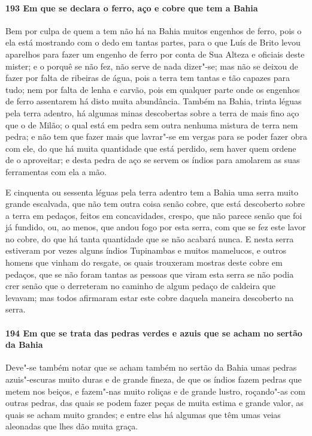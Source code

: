\begin{linenumbers}
\paragraph{193 Em que se declara o ferro, aço e cobre que tem a Bahia}\quad
Bem por culpa de quem a tem não há na Bahia muitos engenhos de ferro, pois o ela está
mostrando com o dedo em tantas partes, para o que Luís de Brito levou aparelhos para fazer
um engenho de ferro por conta de Sua Alteza e oficiais deste mister; e o porquê se não
fez, não serve de nada dizer"-se; mas não se deixou de fazer por falta de ribeiras de água,
pois a terra tem tantas e tão capazes para tudo; nem por falta de lenha e carvão, pois em
qualquer parte onde os engenhos de ferro assentarem há disto muita abundância. Também na
Bahia, trinta léguas pela terra adentro, há algumas minas descobertas sobre a terra de
mais fino aço que o de Milão; o qual está em pedra sem outra nenhuma mistura de terra nem
pedra; e não tem que fazer mais que lavrar"-se em vergas para se poder fazer obra com ele,
do que há muita quantidade que está perdido, sem haver quem ordene de o aproveitar; e
desta pedra de aço se servem os índios para amolarem as suas ferramentas com ela a mão.

E cinquenta ou sessenta léguas pela terra adentro tem a Bahia uma serra muito grande
escalvada, que não tem outra coisa senão cobre, que está descoberto sobre a terra em
pedaços, feitos em concavidades, crespo, que não parece senão que foi já fundido, ou, ao
menos, que andou fogo por esta serra, com que se fez este lavor no cobre, do que há tanta
quantidade que se não acabará nunca. E nesta serra estiveram por vezes alguns índios
Tupinambas e muitos mamelucos, e outros homens que vinham do resgate, os quais trouxeram
mostras deste cobre em pedaços, que se não foram tantas as pessoas que viram esta serra se
não podia crer senão que o derreteram no caminho de algum pedaço de caldeira que levavam;
mas todos afirmaram estar este cobre daquela maneira descoberto na serra.

\paragraph{194 Em que se trata das pedras verdes e azuis que se acham no sertão da Bahia}\quad
Deve"-se também notar que se acham também no sertão da Bahia umas pedras azuis"-escuras
muito duras e de grande fineza, de que os índios fazem pedras que metem nos beiços, e
fazem"-nas muito roliças e de grande lustro, roçando"-as com outras pedras, das quais se
podem fazer peças de muita estima e grande valor, as quais se acham muito grandes; e entre
elas há algumas que têm umas veias aleonadas que lhes dão muita graça.


\end{linenumbers}
